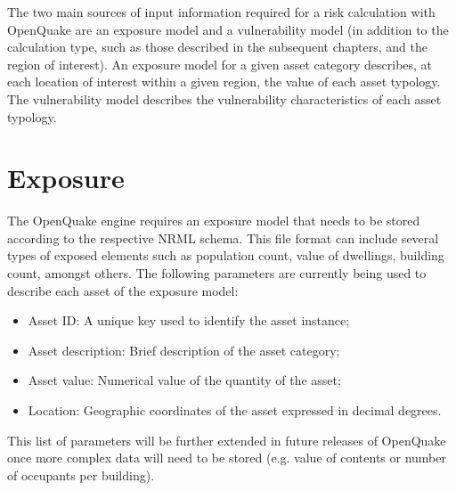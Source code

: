 The two main sources of input information required for a risk calculation with OpenQuake are an exposure model and a vulnerability model (in addition to the calculation type, such as those described in the subsequent chapters, and the region of interest). An exposure model for a given asset category describes, at each location of interest within a given region, the value of each asset typology. The vulnerability model describes the vulnerability characteristics of each asset typology.
\section{Exposure}
The OpenQuake engine requires an exposure model that needs to be stored according to the respective NRML schema. This file format can include several types of exposed elements such as population count, value of dwellings, building count, amongst others. The following parameters are currently being used to describe each asset of the exposure model: 

\begin{itemize}
\item Asset ID: A unique key used to identify the asset instance;
\item Asset description: Brief description of the asset category;
\item Asset value: Numerical value of the quantity of the asset;
\item Location: Geographic coordinates of the asset expressed in decimal degrees.
\end{itemize}

This list of parameters will be further extended in future releases of OpenQuake once more complex data will need to be stored (e.g. value of contents or number of occupants per building).  


